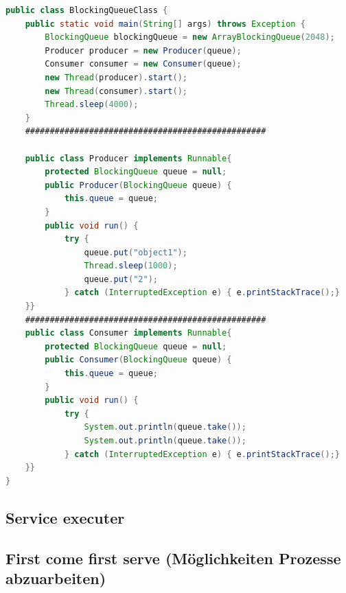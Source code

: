 \begin{lstlisting}[language=java,caption=Java BlockingQueue Beispiel,label=lst:impl:blockingQueue]
    public class BlockingQueueClass {
    public static void main(String[] args) throws Exception {
        BlockingQueue blockingQueue = new ArrayBlockingQueue(2048);
        Producer producer = new Producer(queue);
        Consumer consumer = new Consumer(queue);
        new Thread(producer).start();
        new Thread(consumer).start();
        Thread.sleep(4000);
    }
    #################################################

    public class Producer implements Runnable{
        protected BlockingQueue queue = null;
        public Producer(BlockingQueue queue) {
            this.queue = queue;
        }
        public void run() {
            try {
                queue.put("object1");
                Thread.sleep(1000);
                queue.put("2");
            } catch (InterruptedException e) { e.printStackTrace();}
    }}
    #################################################
    public class Consumer implements Runnable{
        protected BlockingQueue queue = null;
        public Consumer(BlockingQueue queue) {
            this.queue = queue;
        }
        public void run() {
            try {
                System.out.println(queue.take());
                System.out.println(queue.take());
            } catch (InterruptedException e) { e.printStackTrace();}
    }}
}
\end{lstlisting}

\subsection{Service executer}
\subsection{First come first serve (Möglichkeiten Prozesse abzuarbeiten)}